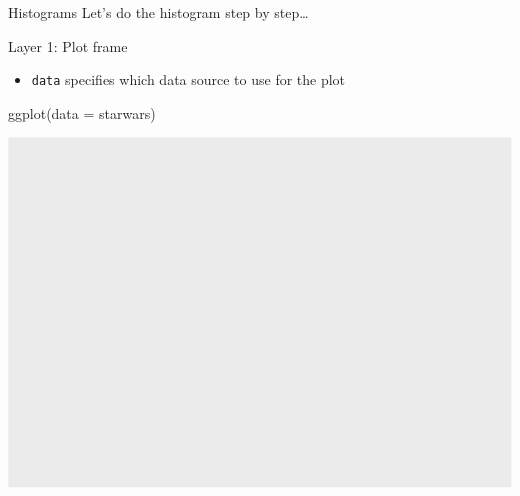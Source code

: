 \documentclass[
  ignorenonframetext,
]{beamer}
\newenvironment{Shaded}{\begin{snugshade}}{\end{snugshade}}
\newcommand{\AttributeTok}[1]{\textcolor[rgb]{0.40,0.45,0.13}{#1}}
\newcommand{\FunctionTok}[1]{\textcolor[rgb]{0.28,0.35,0.67}{#1}}
\newcommand{\NormalTok}[1]{\textcolor[rgb]{0.00,0.23,0.31}{#1}}
\providecommand{\tightlist}{%
  \setlength{\itemsep}{0pt}\setlength{\parskip}{0pt}}\usepackage{longtable,booktabs,array}
\begin{document}
\begin{frame}[fragile]{Histograms}
\protect\hypertarget{histograms}{}
Let's do the histogram step by step\ldots{}

Layer 1: Plot frame

\begin{itemize}
\tightlist
\item
  \texttt{data} specifies which data source to use for the plot
\end{itemize}

\begin{Shaded}
\begin{Highlighting}[]
\FunctionTok{ggplot}\NormalTok{(}\AttributeTok{data =}\NormalTok{ starwars)}
\end{Highlighting}
\end{Shaded}

\includegraphics{GQ_DataViz_Day1_files/figure-beamer/unnamed-chunk-7-1.pdf}
\end{frame}
\end{document}
